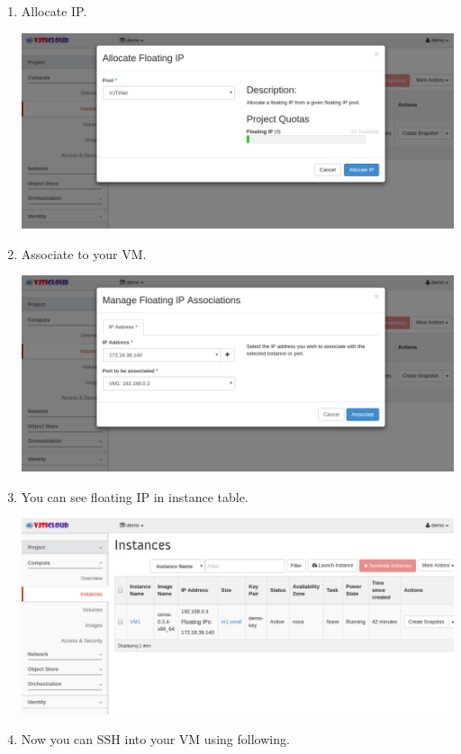 \documentclass[letterpaper,10pt,english]{sphinxmanual}
\begin{document}
\begin{enumerate}
\item {} 
Allocate IP.

\includegraphics{instances-access-floating-ip-allocate.png}

\item {} 
Associate to your VM.

\includegraphics{instances-access-floating-ip-associate.png}

\item {} 
You can see floating IP in instance table.

\includegraphics{instances-access-floating-ip-table.png}

\item {} 
Now you can SSH into your VM using following.

\end{enumerate}
\end{document}
